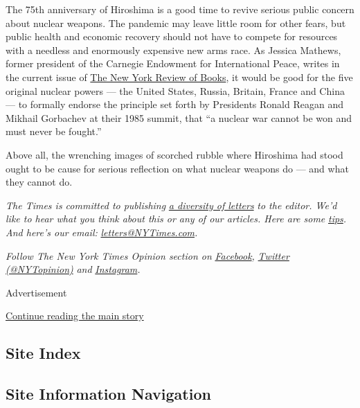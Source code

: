 The 75th anniversary of Hiroshima is a good time to revive serious
public concern about nuclear weapons. The pandemic may leave little room
for other fears, but public health and economic recovery should not have
to compete for resources with a needless and enormously expensive new
arms race. As Jessica Mathews, former president of the Carnegie
Endowment for International Peace, writes in the current issue of
\href{https://www.nybooks.com/contributors/jessica-t-mathews/}{The New
York Review of Books}, it would be good for the five original nuclear
powers --- the United States, Russia, Britain, France and China --- to
formally endorse the principle set forth by Presidents Ronald Reagan and
Mikhail Gorbachev at their 1985 summit, that ``a nuclear war cannot be
won and must never be fought.''

Above all, the wrenching images of scorched rubble where Hiroshima had
stood ought to be cause for serious reflection on what nuclear weapons
do --- and what they cannot do.

\emph{The Times is committed to publishing}
\href{https://www.nytimes3xbfgragh.onion/2019/01/31/opinion/letters/letters-to-editor-new-york-times-women.html}{\emph{a
diversity of letters}} \emph{to the editor. We'd like to hear what you
think about this or any of our articles. Here are some}
\href{https://help.nytimes3xbfgragh.onion/hc/en-us/articles/115014925288-How-to-submit-a-letter-to-the-editor}{\emph{tips}}\emph{.
And here's our email:}
\href{mailto:letters@NYTimes.com}{\emph{letters@NYTimes.com}}\emph{.}

\emph{Follow The New York Times Opinion section on}
\href{https://www.facebookcorewwwi.onion/nytopinion}{\emph{Facebook}}\emph{,}
\href{http://twitter.com/NYTOpinion}{\emph{Twitter (@NYTopinion)}}
\emph{and}
\href{https://www.instagram.com/nytopinion/}{\emph{Instagram}}\emph{.}

Advertisement

\protect\hyperlink{after-bottom}{Continue reading the main story}

\hypertarget{site-index}{%
\subsection{Site Index}\label{site-index}}

\hypertarget{site-information-navigation}{%
\subsection{Site Information
Navigation}\label{site-information-navigation}}

